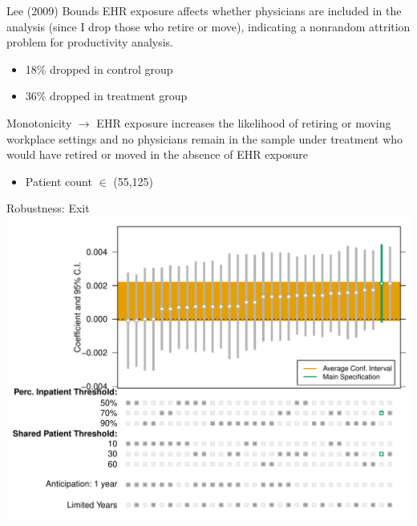 \documentclass[notes,11pt, aspectratio=169]{beamer}
\begin{document}
\begin{frame}[noframenumbering]{Lee (2009) Bounds}
\label{Lee (2009) Bounds}
    EHR exposure affects whether physicians are included in the analysis (since I drop those who retire or move), indicating a nonrandom attrition problem for productivity analysis.
    \begin{itemize}
        \item 18\% dropped in control group
        \item 36\% dropped in treatment group 
    \end{itemize}
    Monotonicity $\rightarrow$ EHR exposure increases the likelihood of retiring or moving workplace settings and no physicians remain in the sample under treatment who would have retired or moved in the absence of EHR exposure
    
    \begin{itemize}
        \item Patient count $\in$ (55,125)
        \hyperlink{Robustness}{}
    \end{itemize}
\end{frame}

\begin{frame}[noframenumbering]{Robustness: Exit}
\label{Robustness: Retirement}
\centering
    \includegraphics[scale=.5]{Objects/retire_chart.pdf}
    \hyperlink{Effect of EHR Exposure on Exit}{}
\end{frame}
\end{document}
